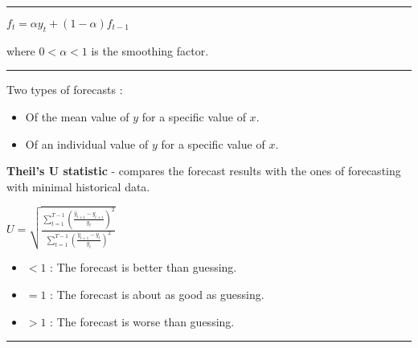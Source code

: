 \columnbreak

\hrule

\begin{f}

\begin{center}
	\(f_{t} = \alpha y_{t} + (1 - \alpha) f_{t - 1}\)
\end{center}

where \(0 < \alpha < 1\) is the smoothing factor.

\end{f}  \hrule

\begin{f}[Forecasts]

Two types of forecasts :

\begin{itemize}[leftmargin=*]
	\item Of the mean value of \(y\) for a specific value of \(x\).
	\item Of an individual value of \(y\) for a specific value of \(x\).
\end{itemize}

\textbf{Theil's U statistic} - compares the forecast results with the ones of forecasting with minimal historical data.

\begin{center}
	\(U = \sqrt{\frac{\sum_{t=1}^{T-1} \left( \frac{\hat{y}_{t+1} - y_{t+1}}{y_t} \right)^2}{\sum_{t=1}^{T-1} \left( \frac{y_ {t+1} - y_t}{y_t} \right)^2}}\)
\end{center}

\begin{itemize}[leftmargin=*]
	\item \(< 1\) : The forecast is better than guessing.
	\item \(= 1\) : The forecast is about as good as guessing.
	\item \(> 1\) : The forecast is worse than guessing.
\end{itemize}



\end{f}  \hrule

